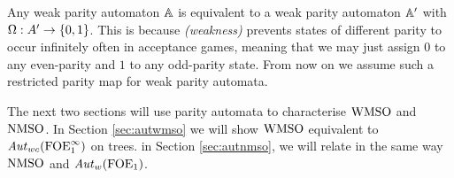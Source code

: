 \begin{remark}\label{rmk:weak01}
Any weak parity automaton $\mathbb{A}$ is equivalent to a weak parity automaton
$\mathbb{A}'$ with $\Omega: A' \to \{0,1\}$. This is because \emph{(weakness)} prevents states of different parity to occur infinitely often in acceptance games, meaning that we may just assign $0$ to any even-parity and $1$ to any odd-parity state. From now on we assume such a restricted parity map for weak parity automata.
\end{remark}



The next two sections will use parity automata to characterise $\mathrm{WMSO}$ and $\mathrm{NMSO}$. In Section \ref{sec:autwmso} we will show $\mathrm{WMSO}$ equivalent to $\mathit{Aut}_{wc}(\mathrm{FOE}^{\infty}_1)$ on trees. in Section \ref{sec:autnmso}, we will relate in the same way $\mathrm{NMSO}$ and $\mathit{Aut}_{w}(\mathrm{FOE}_1)$.

